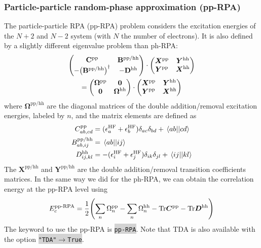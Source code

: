 \documentclass[aip,jcp,reprint,noshowkeys,superscriptaddress]{revtex4-1}
\newcommand{\HF}{\text{HF}}
\newcommand{\pp}{\text{pp}}
\newcommand{\hh}{\text{hh}}
\newcommand{\ep}{\epsilon}
\newcommand{\bO}{\mathbf{0}}
\newcommand{\bX}{\bm{X}}
\newcommand{\bY}{\bm{Y}}
\newcommand{\bB}{\mathbf{B}}
\newcommand{\bC}{\mathbf{C}}
\newcommand{\bD}{\mathbf{D}}
\newcommand{\bOme}{\boldsymbol{\Omega}}
\newcommand{\EcppRPA}{E_c^{\text{pp-RPA}}}
\newcommand{\pERI}[2]{\mel{#1}{}{#2}}
\newcommand{\keyword}[1]{{\colorbox{lightgray}{\texttt{#1}}}}
\begin{document}
\subsubsection*{Particle-particle random-phase approximation (pp-RPA)}
\label{subsec:pp-RPA}

The particle-particle RPA (pp-RPA) problem considers the excitation energies of the $N+2$ and $N-2$ system (with $N$ the number of electrons). It is also defined by a slightly different eigenvalue problem than ph-RPA:
\begin{multline}
\label{eq:ppRPA}
	\begin{pmatrix}
		\bC^{\pp} & \bB^{\pp/\hh}
		\\
		-\qty(\bB^{\pp/\hh})^{\dag} &  -\bD^{\hh}
	\end{pmatrix}
	\cdot
	\begin{pmatrix}
		\bX^{\pp} & \bY^{\hh}
		\\
		\bY^{\pp} & \bX^{\hh}
	\end{pmatrix}
	\\
	=
	\begin{pmatrix}
		\bOme^{\pp} & \bO 
		\\
		\bO & \bOme^{\hh}
	\end{pmatrix}
	\cdot
	\begin{pmatrix}
		\bX^{\pp} & \bY^{\hh}
		\\
		\bY^{\pp} & \bX^{\hh}
	\end{pmatrix}
\end{multline} 
where $\bOme^{\pp/\hh}$ are the diagonal matrices of the double addition/removal excitation energies, labeled by $n$, and the matrix elements are defined as 
\begin{subequations}
\begin{align}
	C_{ab,cd}^{\pp} 
	& = (\ep_{a}^{\HF} + \ep_{b}^{\HF}) \delta_{ac} \delta_{bd} + \pERI{ab}{cd}
	\\
	B_{ab,ij}^{\pp/\hh} 
	& = \pERI{ab}{ij}
	\\
	D_{ij,kl}^{\hh} 
	& = -(\ep_{i}^{\HF} + \ep_{j}^{\HF}) \delta_{ik} \delta_{jl} + \pERI{ij}{kl}
\end{align}
\end{subequations}
The $\bX^{\pp/\hh}$ and $\bY^{\pp/\hh}$ are the double addition/removal transition coefficients matrices. In the same way we did for the ph-RPA, we can obtain the correlation energy at the pp-RPA level using \cite{Peng_2013}
\begin{equation}
\EcppRPA =  \frac{1}{2} \qty(\sum_n \Omega_n^{\pp}  - \sum_n \Omega_n^{\hh}  - \text{Tr}\bm{C}^{\pp} - \text{Tr}\bm{D}^{\hh})
\end{equation}
The keyword to use the pp-RPA is \keyword{pp-RPA}. Note that TDA is also available with the option \keyword{"TDA"$\rightarrow$True}.
\end{document}
